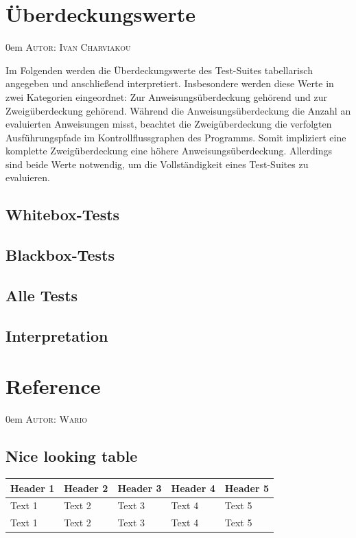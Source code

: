 \documentclass{article}
\makeatletter
\newcommand{\sectionauthor}[1]{
	{\parindent 0em \large \scshape Autor: #1 \par \nobreak \vspace*{1em}}
	\@afterheading
}
\makeatother
\begin{document}
\section{Überdeckungswerte}
\sectionauthor{Ivan Charviakou}

Im Folgenden werden die Überdeckungswerte des Test-Suites tabellarisch angegeben und anschließend interpretiert. 
Insbesondere werden diese Werte in zwei Kategorien eingeordnet: Zur Anweisungsüberdeckung gehörend und zur Zweigüberdeckung gehörend. 
Während die Anweisungsüberdeckung die Anzahl an evaluierten Anweisungen misst, beachtet die Zweigüberdeckung die verfolgten Ausführungspfade im Kontrollflussgraphen des Programms.
Somit impliziert eine komplette Zweigüberdeckung eine höhere Anweisungsüberdeckung. 
Allerdings sind beide Werte notwendig, um die Vollständigkeit eines Test-Suites zu evaluieren.

\subsection{Whitebox-Tests}

\subsection{Blackbox-Tests}

\subsection{Alle Tests}

\subsection{Interpretation}

\newpage

\section{Reference}
\sectionauthor{Wario}

\subsection{Nice looking table}
\begin{longtable}{@{}lllll@{}}
\toprule
\textbf{Header 1} & \textbf{Header 2} & \textbf{Header 3} & \textbf{Header 4} & \textbf{Header 5} \\* \midrule
\endfirsthead
%
\endhead
%
Text 1            & Text 2            & Text 3            & Text 4            & Text 5            \\
Text 1            & Text 2            & Text 3            & Text 4            & Text 5            \\* \bottomrule
\end{longtable}
\end{document}
